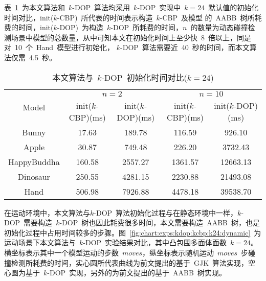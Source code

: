 表~\ref{tab:exper:kcbp:kdop:init:k24}~为本文算法和~$k$-DOP~算法均采用~$k$-DOP~实现中~$k=24$~默认值的初始化时间对比，init($k$-CBP)~所代表的时间表示构造~$k$-CBP~及模型
的~AABB~树所耗费的时间，init($k$-DOP)~为构造~$k$-DOP~所耗费的时间，$n$~的数量为动态碰撞检测场景中模型的总数量，从中可知本文在初始化时间上至少快~8~倍以上，同是对~10~个~Hand~模型进行初始化，
$k$-DOP~算法需要近~40~秒的时间，而本文算法仅需~4.5~秒。

\begin{table}[htbp]
\centering
\caption{本文算法与~$k$-DOP~初始化时间对比($k=24$)}
\label{tab:exper:kcbp:kdop:init:k24}
\begin{tabular}{ccccc}
\toprule[1.5pt]
\multirow{2}{*}{Model} & \multicolumn{2}{c}{$n=2$} &
\multicolumn{2}{c}{$n=10$}\\
\cmidrule(lr){2-3}\cmidrule(lr){4-5}
~&init($k$-CBP)(ms)&init($k$-DOP)(ms)& init($k$-CBP)(ms)&init($k$-DOP)(ms) \\
\midrule[1pt]
Bunny    &17.63  &189.78   &116.59 	  &926.10   	 \\
Apple    &30.87  &749.48   &226.20 	  &3732.43  	 \\
HappyBuddha	&160.58 	&2557.27 	&1361.57 	&12663.13  \\
Dinosaur &250.55 &4281.15  &2230.88	  &21493.08 	 \\
Hand	&506.98 &	7926.88 &	4478.18 &	39538.70 \\ 
\bottomrule[1.5pt]
\end{tabular}
\end{table}

在运动环境中，本文算法与$k$-DOP~算法初始化过程与在静态环境中一样，$k$-DOP~需要构造~$k$-DOP~树也因此耗费很多时间，本文需要构造~AABB~树，也是初始化过程中占用时间较多的步骤。图~\ref{fig:chart:exps:kdop:kcbp:k24:dynamic}~为运动场景下本文算法与~$k$-DOP~实验结果对比，其中凸包围多面体面数~$k=24$。
横坐标表示其中一个模型运动的步数~$moves$，纵坐标表示随机运动~$moves$~步碰撞检测所耗费的时间，实心圆所代表曲线为前文提出的基于~GJK~算法实现，空心圆为基于~$k$-DOP~实现，另外的为前文提出的基于~AABB~树实现。


